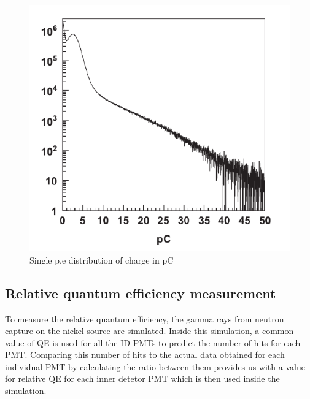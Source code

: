 \begin{figure}
    \includegraphics[width=\textwidth]{Figures/singlepe.png}
\caption{Single p.e distribution of charge in pC }
    \label{fig:singlepe}
\end{figure}
    

\subsection{Relative quantum efficiency measurement}

To measure the relative quantum efficiency, the gamma rays from neutron capture on the nickel source are simulated. Inside this simulation, a common value of QE is used for all the ID PMTs to predict the number of hits for each PMT. Comparing this number of hits to the actual data obtained for each individual PMT by calculating the ratio between them provides us with a value for relative QE for each inner detetor PMT which is then used inside the simulation. 

